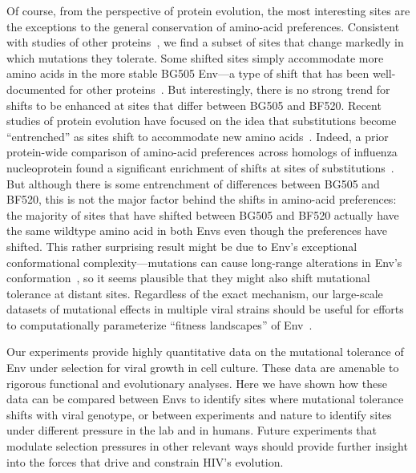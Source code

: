 \documentclass[9pt]{elife}
\begin{document}
Of course, from the perspective of protein evolution, the most interesting sites are the exceptions to the general conservation of amino-acid preferences.
Consistent with studies of other proteins~\citep{natarajan2013epistasis,harms2014historical,doud2015site,starr2017pervasive}, we find a subset of sites that change markedly in which mutations they tolerate.
Some shifted sites simply accommodate more amino acids in the more stable BG505 Env---a type of shift that has been well-documented for other proteins~\citep{wang2002evolution,bloom2006protein,gong2013stability,kumar2017stability}.
But interestingly, there is no strong trend for shifts to be enhanced at sites that differ between BG505 and BF520.
Recent studies of protein evolution have focused on the idea that substitutions become ``entrenched'' as sites shift to accommodate new amino acids~\citep{pollock2012amino,shah2015contingency,bazykin2015changing,starr2017pervasive}.
Indeed, a prior protein-wide comparison of amino-acid preferences across homologs of influenza nucleoprotein found a significant enrichment of shifts at sites of substitutions~\citep{doud2015site}.
But although there is some entrenchment of differences between BG505 and BF520, this is not the major factor behind the shifts in amino-acid preferences: the majority of sites that have shifted between BG505 and BF520 actually have the same wildtype amino acid in both Envs even though the preferences have shifted.
This rather surprising result might be due to Env's exceptional conformational complexity---mutations can cause long-range alterations in Env's conformation~\citep{kwong2000structures,white2010molecular,almond2010structural,davenport2013isolate}, so it seems plausible that they might also shift mutational tolerance at distant sites. 
Regardless of the exact mechanism, our large-scale datasets of mutational effects in multiple viral strains should be useful for efforts to computationally parameterize ``fitness landscapes'' of Env~\citep{kouyos2012exploring,ferguson2013translating,mann2014fitness,barton2015scaling,louie2018fitness}.

Our experiments provide highly quantitative data on the mutational tolerance of Env under selection for viral growth in cell culture.
These data are amenable to rigorous functional and evolutionary analyses.
Here we have shown how these data can be compared between Envs to identify sites where mutational tolerance shifts with viral genotype, or between experiments and nature to identify sites under different pressure in the lab and in humans.
Future experiments that modulate selection pressures in other relevant ways should provide further insight into the forces that drive and constrain HIV's evolution.
\end{document}
